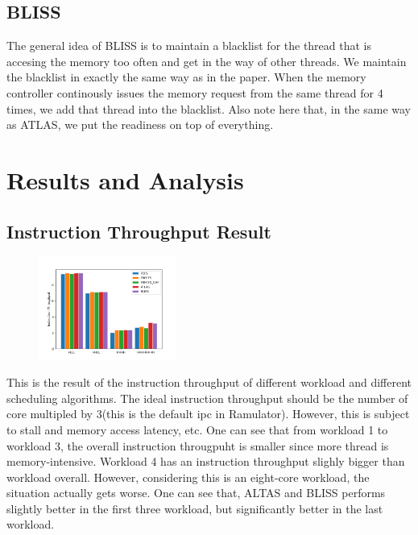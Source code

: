 \documentclass[letterpaper,twocolumn]{article}
\begin{document}
\subsection{BLISS} 
The general idea of BLISS is to maintain a blacklist for the thread that is accesing the memory too often and 
get in the way of other threads. We maintain the blacklist in exactly the same way as in the paper. When the memory controller 
continously issues the memory request from the same thread for 4 times, we add that thread into the blacklist. Also note here that, 
in the same way as ATLAS, we put the readiness on top of everything. 


%

\section{Results and Analysis}

\subsection{Instruction Throughput Result}
\begin{figure}[!h]
\includegraphics[width=0.4\textwidth]{Figure_1.png}
\end{figure}
This is the result of the instruction throughput of different workload and different scheduling algorithms. 
The ideal instruction throughput should be the number of core multipled by 3(this is the default ipc in Ramulator). However, this is subject to stall and memory access latency, etc. 
One can see that from workload 1 to workload 3, the overall instruction througpuht is smaller 
since more thread is memory-intensive. Workload 4 has an instruction throughput slighly bigger than workload overall. However, considering this is 
an eight-core workload, the situation actually gets worse. One can see that, ALTAS and BLISS performs slightly better in the first three 
workload, but significantly better in the last workload. 
\end{document}
